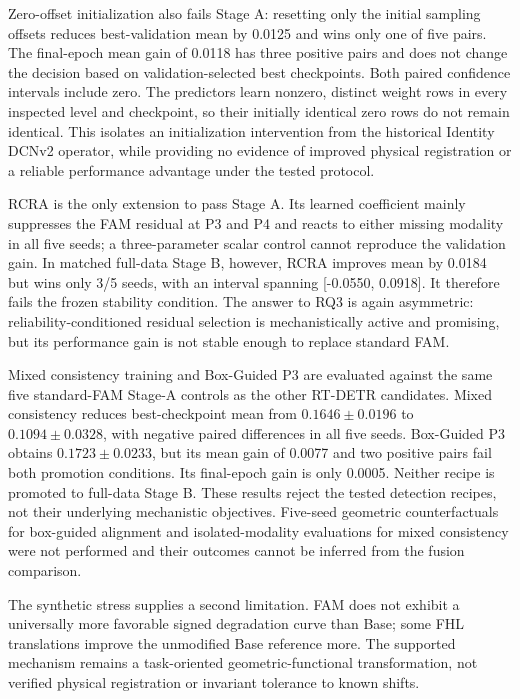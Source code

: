 Zero-offset initialization also fails Stage A: resetting only the initial
sampling offsets reduces best-validation mean \mapfifty{} by 0.0125 and wins
only one of five pairs. The final-epoch mean gain of 0.0118 has three positive
pairs and does not change the decision based on validation-selected best
checkpoints. Both paired confidence intervals include zero. The predictors
learn nonzero, distinct weight rows in every inspected level and checkpoint,
so their initially identical zero rows do not remain identical. This isolates
an initialization intervention from the historical Identity DCNv2 operator,
while providing no evidence of improved physical registration or a reliable
performance advantage under the tested protocol.

RCRA is the only extension to pass Stage A. Its learned coefficient mainly
suppresses the FAM residual at P3 and P4 and reacts to either missing modality
in all five seeds; a three-parameter scalar control cannot reproduce the
validation gain. In matched full-data Stage B, however, RCRA improves mean
\mapfifty{} by 0.0184 but wins only 3/5 seeds, with an interval spanning
[-0.0550, 0.0918]. It therefore fails the frozen stability condition. The
answer to RQ3 is again asymmetric: reliability-conditioned residual selection
is mechanistically active and promising, but its performance gain is not
stable enough to replace standard FAM.

Mixed consistency training and Box-Guided P3 are evaluated against the same
five standard-FAM Stage-A controls as the other RT-DETR candidates. Mixed
consistency reduces best-checkpoint mean \mapfifty{} from
\(0.1646\pm0.0196\) to \(0.1094\pm0.0328\), with negative paired differences
in all five seeds. Box-Guided P3 obtains \(0.1723\pm0.0233\), but its mean
gain of 0.0077 and two positive pairs fail both promotion conditions. Its
final-epoch gain is only 0.0005. Neither recipe is promoted to full-data Stage B.
These results reject the tested detection recipes, not their underlying
mechanistic objectives. Five-seed geometric counterfactuals for box-guided
alignment and isolated-modality evaluations for mixed consistency were not
performed and their outcomes cannot be inferred from the fusion comparison.

The synthetic stress supplies a second limitation. FAM does not exhibit a
universally more favorable signed degradation curve than Base; some FHL
translations improve the unmodified Base reference more. The
supported mechanism remains a task-oriented geometric-functional
transformation, not verified physical registration or invariant tolerance to
known shifts.

